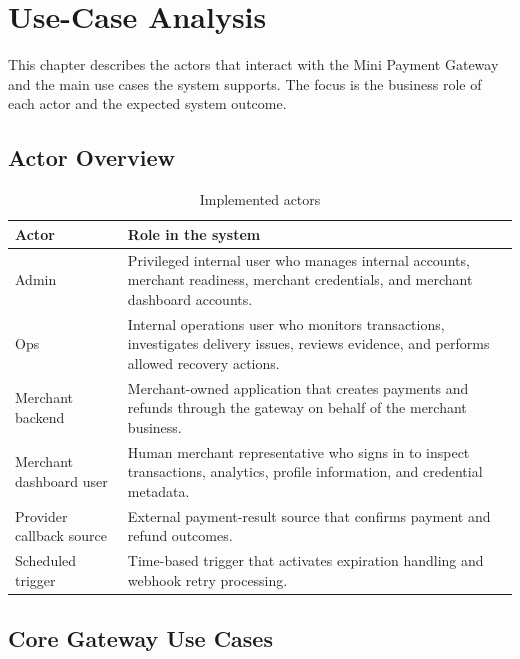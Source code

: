 \chapter{Use-Case Analysis}

This chapter describes the actors that interact with the Mini Payment Gateway
and the main use cases the system supports. The focus is the business role of
each actor and the expected system outcome.

\section{Actor Overview}

\begin{table}[!htbp]
\centering
\caption{Implemented actors}
\begin{tabularx}{\textwidth}{L{0.25\textwidth}Y}
\toprule
\textbf{Actor} & \textbf{Role in the system} \\
\midrule
Admin & Privileged internal user who manages internal accounts, merchant
readiness, merchant credentials, and merchant dashboard accounts. \\
\bodyrowrule
Ops & Internal operations user who monitors transactions, investigates delivery
issues, reviews evidence, and performs allowed recovery actions. \\
\bodyrowrule
Merchant backend & Merchant-owned application that creates payments and refunds
through the gateway on behalf of the merchant business. \\
\bodyrowrule
Merchant dashboard user & Human merchant representative who signs in to inspect
transactions, analytics, profile information, and credential metadata. \\
\bodyrowrule
Provider callback source & External payment-result source that confirms payment
and refund outcomes. \\
\bodyrowrule
Scheduled trigger & Time-based trigger that activates expiration handling and
webhook retry processing. \\
\bottomrule
\end{tabularx}
\end{table}

\section{Core Gateway Use Cases}


